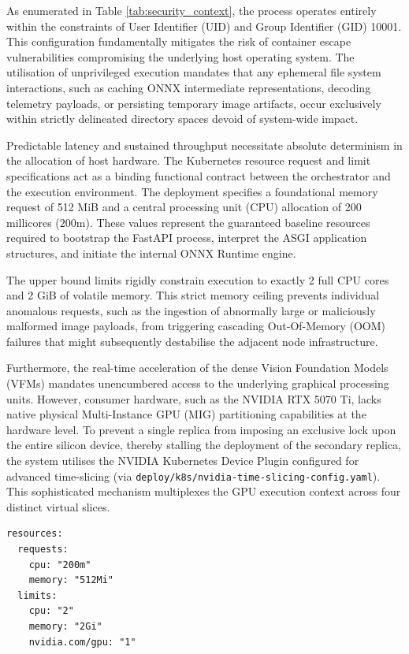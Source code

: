 As enumerated in Table \ref{tab:security_context}, the process operates entirely within the constraints of User Identifier (UID) and Group Identifier (GID) 10001. This configuration fundamentally mitigates the risk of container escape vulnerabilities compromising the underlying host operating system. The utilisation of unprivileged execution mandates that any ephemeral file system interactions, such as caching ONNX intermediate representations, decoding telemetry payloads, or persisting temporary image artifacts, occur exclusively within strictly delineated directory spaces devoid of system-wide impact.

Predictable latency and sustained throughput necessitate absolute determinism in the allocation of host hardware. The Kubernetes resource request and limit specifications act as a binding functional contract between the orchestrator and the execution environment. The deployment specifies a foundational memory request of 512 MiB and a central processing unit (CPU) allocation of 200 millicores ($200\text{m}$). These values represent the guaranteed baseline resources required to bootstrap the FastAPI process, interpret the ASGI application structures, and initiate the internal ONNX Runtime engine.

The upper bound limits rigidly constrain execution to exactly 2 full CPU cores and 2 GiB of volatile memory. This strict memory ceiling prevents individual anomalous requests, such as the ingestion of abnormally large or maliciously malformed image payloads, from triggering cascading Out-Of-Memory (OOM) failures that might subsequently destabilise the adjacent node infrastructure.

Furthermore, the real-time acceleration of the dense Vision Foundation Models (VFMs) mandates unencumbered access to the underlying graphical processing units. However, consumer hardware, such as the NVIDIA RTX 5070 Ti, lacks native physical Multi-Instance GPU (MIG) partitioning capabilities at the hardware level. To prevent a single replica from imposing an exclusive lock upon the entire silicon device, thereby stalling the deployment of the secondary replica, the system utilises the NVIDIA Kubernetes Device Plugin configured for advanced time-slicing (via \texttt{deploy/k8s/nvidia-time-slicing-config.yaml}). This sophisticated mechanism multiplexes the GPU execution context across four distinct virtual slices.

\begin{listing}[htbp]
\begin{verbatim}
resources:
  requests:
    cpu: "200m"
    memory: "512Mi"
  limits:
    cpu: "2"
    memory: "2Gi"
    nvidia.com/gpu: "1"
\end{verbatim}
\caption{Resource allocation encompassing the virtualised GPU hardware slice.}
\label{lst:resource_allocation}
\end{listing}

